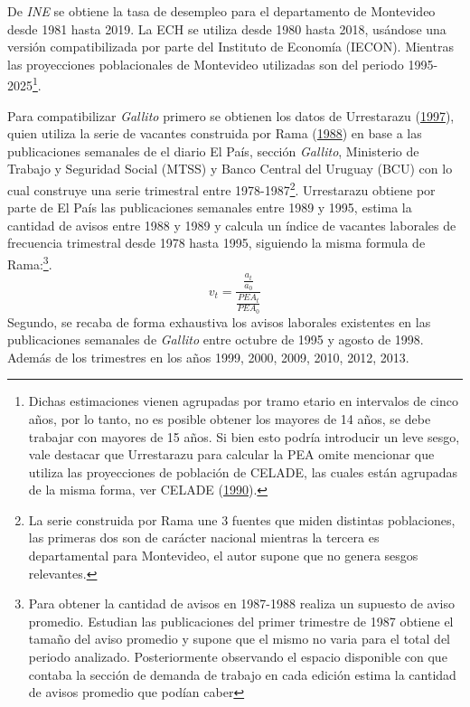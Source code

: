 \documentclass[12pt,oneside]{reedthesis}
\begin{document}
De \emph{INE} se obtiene la tasa de desempleo para el departamento de Montevideo desde 1981 hasta 2019.
La ECH se utiliza desde 1980 hasta 2018, usándose una versión compatibilizada por parte del Instituto de Economía (IECON). Mientras las proyecciones poblacionales de Montevideo utilizadas son del periodo 1995-2025\footnote{Dichas estimaciones vienen agrupadas por tramo etario en intervalos de cinco años, por lo tanto, no es posible obtener los mayores de 14 años, se debe trabajar con mayores de 15 años. Si bien esto podría introducir un leve sesgo, vale destacar que Urrestarazu para calcular la PEA omite mencionar que utiliza las proyecciones de población de CELADE, las cuales están agrupadas de la misma forma, ver CELADE (\protect\hyperlink{ref-Celade1990}{1990}).}.

Para compatibilizar \emph{Gallito} primero se obtienen los datos de Urrestarazu (\protect\hyperlink{ref-Urrestarazu1997}{1997}), quien utiliza la serie de vacantes construida por Rama (\protect\hyperlink{ref-Rama1988}{1988}) en base a las publicaciones semanales de el diario El País, sección \emph{Gallito}, Ministerio de Trabajo y Seguridad Social (MTSS) y Banco Central del Uruguay (BCU) con lo cual construye una serie trimestral entre 1978-1987\footnote{La serie construida por Rama une 3 fuentes que miden distintas poblaciones, las primeras dos son de carácter nacional mientras la tercera es departamental para Montevideo, el autor supone que no genera sesgos relevantes.}. Urrestarazu obtiene por parte de El País las publicaciones semanales entre 1989 y 1995, estima la cantidad de avisos entre 1988 y 1989 y calcula un índice de vacantes laborales de frecuencia trimestral desde 1978 hasta 1995, siguiendo la misma formula de Rama:\footnote{Para obtener la cantidad de avisos en 1987-1988 realiza un supuesto de aviso promedio. Estudian las publicaciones del primer trimestre de 1987 obtiene el tamaño del aviso promedio y supone que el mismo no varia para el total del periodo analizado. Posteriormente observando el espacio disponible con que contaba la sección de demanda de trabajo en cada edición estima la cantidad de avisos promedio que podían caber}.
\begin{equation}
v_t = \frac{\frac{a_t}{a_0}}{\frac{PEA_t}{PEA_0}}
\end{equation}
Segundo, se recaba de forma exhaustiva los avisos laborales existentes en las publicaciones semanales de \emph{Gallito} entre octubre de 1995 y agosto de 1998. Además de los trimestres en los años 1999, 2000, 2009, 2010, 2012, 2013.
\end{document}
